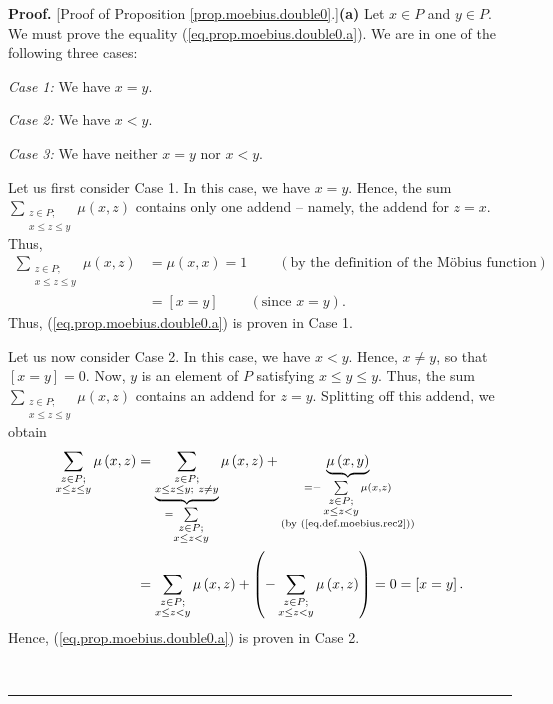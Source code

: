 \documentclass[numbers=enddot,12pt,final,onecolumn,notitlepage]{scrartcl}%
\theoremstyle{definition}
\newenvironment{proof}[1][Proof]{\noindent\textbf{#1.} }{\ \rule{0.5em}{0.5em}}
\newenvironment{vershort}{}{}
\let\sumnonlimits\sum
\renewcommand{\sum}{\sumnonlimits\limits}
\begin{document}
\begin{vershort}
\begin{proof}
[Proof of Proposition \ref{prop.moebius.double0}.]\textbf{(a)} Let $x\in P$
and $y\in P$. We must prove the equality (\ref{eq.prop.moebius.double0.a}). We
are in one of the following three cases:

\textit{Case 1:} We have $x=y$.

\textit{Case 2:} We have $x<y$.

\textit{Case 3:} We have neither $x=y$ nor $x<y$.

Let us first consider Case 1. In this case, we have $x=y$. Hence, the sum
$\sum_{\substack{z\in P;\\x\leq z\leq y}}\mu\left(  x,z\right)  $ contains
only one addend -- namely, the addend for $z=x$. Thus,%
\begin{align*}
\sum_{\substack{z\in P;\\x\leq z\leq y}}\mu\left(  x,z\right)   &  =\mu\left(
x,x\right)  =1\ \ \ \ \ \ \ \ \ \ \left(  \text{by the definition of the
M\"{o}bius function}\right) \\
&  =\left[  x=y\right]  \ \ \ \ \ \ \ \ \ \ \left(  \text{since }x=y\right)  .
\end{align*}
Thus, (\ref{eq.prop.moebius.double0.a}) is proven in Case 1.

Let us now consider Case 2. In this case, we have $x<y$. Hence, $x\neq y$, so
that $\left[  x=y\right]  =0$. Now, $y$ is an element of $P$ satisfying $x\leq
y\leq y$. Thus, the sum $\sum_{\substack{z\in P;\\x\leq z\leq y}}\mu\left(
x,z\right)  $ contains an addend for $z=y$. Splitting off this addend, we
obtain%
\begin{align*}
\sum_{\substack{z\in P;\\x\leq z\leq y}}\mu\left(  x,z\right)   &
=\underbrace{\sum_{\substack{z\in P;\\x\leq z\leq y;\ z\neq y}}}%
_{=\sum_{\substack{z\in P;\\x\leq z<y}}}\mu\left(  x,z\right)
+\underbrace{\mu\left(  x,y\right)  }_{\substack{=-\sum_{\substack{z\in
P;\\x\leq z<y}}\mu\left(  x,z\right)  \\\text{(by (\ref{eq.def.moebius.rec2}%
))}}}\\
&  =\sum_{\substack{z\in P;\\x\leq z<y}}\mu\left(  x,z\right)  +\left(
-\sum_{\substack{z\in P;\\x\leq z<y}}\mu\left(  x,z\right)  \right)
=0=\left[  x=y\right]  .
\end{align*}
Hence, (\ref{eq.prop.moebius.double0.a}) is proven in Case 2.


\end{proof}
\end{vershort}
\end{document}
